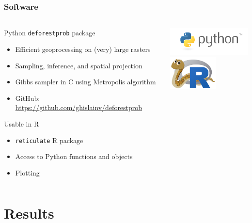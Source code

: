 \documentclass[slidetop,10pt,dvipsnames,leqno,fleqn]{beamer} %
\begin{document}
\begin{frame}
  \frametitle{Software}
  \framesubtitle{}
  \begin{columns}
    \begin{column}{0.6\textwidth}
      \begin{block}{Python \texttt{deforestprob} package}
        \begin{itemize}
        \item Efficient geoprocessing on (very) large rasters
        \item Sampling, inference, and spatial projection
        \item Gibbs sampler in C using Metropolis algorithm
        \item GitHub: \url{https://github.com/ghislainv/deforestprob}
        \end{itemize}
      \end{block}
      \begin{block}{Usable in R}
        \begin{itemize}
        \item \texttt{reticulate} R package
        \item Access to Python functions and objects
        \item Plotting
        \end{itemize}
      \end{block}
    \end{column}
    \begin{column}{0.4\textwidth}
      \centering \includegraphics[width=4.5cm]{./Figures/python-logo.png} \\
      \centering \includegraphics[width=2.5cm]{./Figures/reticulated_python.png}
    \end{column}
  \end{columns}
\end{frame}

\section{Results}
\end{document}
